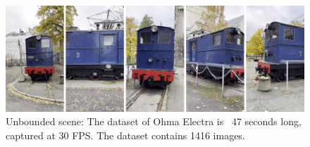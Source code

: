 \begin{figure}[!h]
    \centering
    \includegraphics[width=1.0\textwidth]{figures/ohma_electra.png}
    \caption{Unbounded scene: The dataset of Ohma Electra is ~47 seconds long, captured at 30 FPS. The dataset contains 1416 images.}
    \label{fig:ohma-electra}
\end{figure}